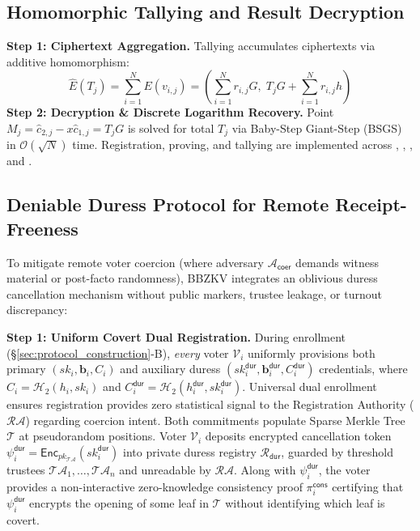 \documentclass[10pt,letterpaper,journal]{IEEEtran}
\begin{document}
\subsection{Homomorphic Tallying and Result Decryption}
\textbf{Step 1: Ciphertext Aggregation.} Tallying accumulates ciphertexts via additive homomorphism:
\begin{equation}
  \hat{E}(T_j) = \sum_{i=1}^{N} E(v_{i,j}) = \left( \sum_{i=1}^{N} r_{i,j} G, \; T_j G + \sum_{i=1}^{N} r_{i,j} h \right)
\end{equation}
\textbf{Step 2: Decryption \& Discrete Logarithm Recovery.} Point $M_j = \hat{c}_{2,j} - x \hat{c}_{1,j} = T_j G$ is solved for total $T_j$ via Baby-Step Giant-Step (BSGS) in $\mathcal{O}(\sqrt{N})$ time. Registration, proving, and tallying are implemented across , , , and .

\subsection{Deniable Duress Protocol for Remote Receipt-Freeness}
\label{subsec:duress_mechanism}
To mitigate remote voter coercion (where adversary $\mathcal{A}_{\mathsf{coer}}$ demands witness material or post-facto randomness), \textsc{BBZKV} integrates an oblivious duress cancellation mechanism without public markers, trustee leakage, or turnout discrepancy:

\textbf{Step 1: Uniform Covert Dual Registration.} During enrollment (\S\ref{sec:protocol_construction}-B), \emph{every} voter $\mathcal{V}_i$ uniformly provisions both primary $(sk_i, \mathbf{b}_i, C_i)$ and auxiliary duress $(sk_i^{\mathsf{dur}}, \mathbf{b}_i^{\mathsf{dur}}, C_i^{\mathsf{dur}})$ credentials, where $C_i = \mathcal{H}_2(h_i, sk_i)$ and $C_i^{\mathsf{dur}} = \mathcal{H}_2(h_i^{\mathsf{dur}}, sk_i^{\mathsf{dur}})$. Universal dual enrollment ensures registration provides zero statistical signal to the Registration Authority ($\mathcal{RA}$) regarding coercion intent. Both commitments populate Sparse Merkle Tree $\mathcal{T}$ at pseudorandom positions. Voter $\mathcal{V}_i$ deposits encrypted cancellation token $\psi_i^{\mathsf{dur}} = \mathsf{Enc}_{pk_{\mathcal{TA}}}(sk_i^{\mathsf{dur}})$ into private duress registry $\mathcal{R}_{\mathsf{dur}}$, guarded by threshold trustees $\mathcal{TA}_1, \dots, \mathcal{TA}_n$ and unreadable by $\mathcal{RA}$. Along with $\psi_i^{\mathsf{dur}}$, the voter provides a non-interactive zero-knowledge consistency proof $\pi_i^{\mathsf{cons}}$ certifying that $\psi_i^{\mathsf{dur}}$ encrypts the opening of some leaf in $\mathcal{T}$ without identifying which leaf is covert.
\end{document}

